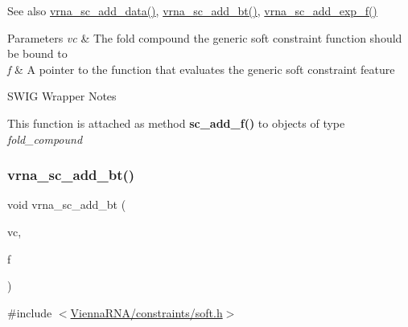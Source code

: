 \begin{DoxySeeAlso}{See also}
\mbox{\hyperlink{group__soft__constraints_ga15c6d52471ec97897e2bb7f964f5deb6}{vrna\+\_\+sc\+\_\+add\+\_\+data()}}, \mbox{\hyperlink{group__soft__constraints_gabde7d07a79bb9a8f4721aee247b674ea}{vrna\+\_\+sc\+\_\+add\+\_\+bt()}}, \mbox{\hyperlink{group__soft__constraints_ga87e382b5d0c9b7d9ce1b79c0473ff700}{vrna\+\_\+sc\+\_\+add\+\_\+exp\+\_\+f()}}
\end{DoxySeeAlso}

\begin{DoxyParams}{Parameters}
{\em vc} & The fold compound the generic soft constraint function should be bound to \\
\hline
{\em f} & A pointer to the function that evaluates the generic soft constraint feature\\
\hline
\end{DoxyParams}
\begin{DoxyRefDesc}{S\+W\+I\+G Wrapper Notes}
\item[\mbox{\hyperlink{wrappers__wrappers000040}{S\+W\+I\+G Wrapper Notes}}]This function is attached as method {\bfseries{sc\+\_\+add\+\_\+f()}} to objects of type {\itshape fold\+\_\+compound} \end{DoxyRefDesc}
\mbox{\label{group__soft__constraints_gabde7d07a79bb9a8f4721aee247b674ea}} 
\subsubsection{\texorpdfstring{vrna\_sc\_add\_bt()}{vrna\_sc\_add\_bt()}}
{\footnotesize\ttfamily void vrna\+\_\+sc\+\_\+add\+\_\+bt (\begin{DoxyParamCaption}\item[{\mbox{\hyperlink{group__fold__compound_ga1b0cef17fd40466cef5968eaeeff6166}{vrna\+\_\+fold\+\_\+compound\+\_\+t}} $\ast$}]{vc,  }\item[{\mbox{\hyperlink{group__soft__constraints_gaeb6448da6c593d4c489c7fbadcb99499}{vrna\+\_\+callback\+\_\+sc\+\_\+backtrack}} $\ast$}]{f }\end{DoxyParamCaption})}



{\ttfamily \#include $<$\mbox{\hyperlink{soft_8h}{Vienna\+R\+N\+A/constraints/soft.\+h}}$>$}



